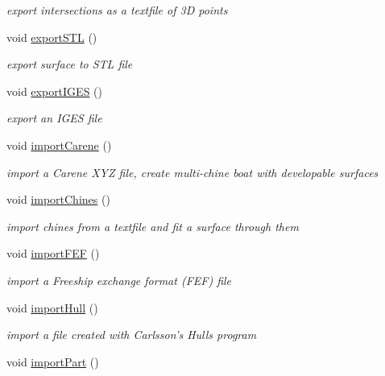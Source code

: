 \begin{DoxyCompactItemize}
\begin{DoxyCompactList}\small\item\em export intersections as a textfile of 3\-D points \end{DoxyCompactList}\item 
void \hyperlink{classShipCAD_1_1Controller_a11a8473f84eeed35f9f48c119da16351}{export\-S\-T\-L} ()
\begin{DoxyCompactList}\small\item\em export surface to S\-T\-L file \end{DoxyCompactList}\item 
void \hyperlink{classShipCAD_1_1Controller_aff36c67432f7527fccad4b0b90c226a9}{export\-I\-G\-E\-S} ()
\begin{DoxyCompactList}\small\item\em export an I\-G\-E\-S file \end{DoxyCompactList}\item 
void \hyperlink{classShipCAD_1_1Controller_aef735cfaf32fe83bf1091f9323e7061b}{import\-Carene} ()
\begin{DoxyCompactList}\small\item\em import a Carene X\-Y\-Z file, create multi-\/chine boat with developable surfaces \end{DoxyCompactList}\item 
void \hyperlink{classShipCAD_1_1Controller_a589baec274c41aef111fed029cc1f347}{import\-Chines} ()
\begin{DoxyCompactList}\small\item\em import chines from a textfile and fit a surface through them \end{DoxyCompactList}\item 
void \hyperlink{classShipCAD_1_1Controller_a1e36fc51758f120731b0ff79855fab05}{import\-F\-E\-F} ()
\begin{DoxyCompactList}\small\item\em import a Freeship exchange format (F\-E\-F) file \end{DoxyCompactList}\item 
void \hyperlink{classShipCAD_1_1Controller_a0ce9a5b0d89230deea8a85cd32ec24da}{import\-Hull} ()
\begin{DoxyCompactList}\small\item\em import a file created with Carlsson's Hulls program \end{DoxyCompactList}\item 
void \hyperlink{classShipCAD_1_1Controller_aa17d0e883689538500f2bac63c0d1736}{import\-Part} ()

\end{DoxyCompactItemize}
